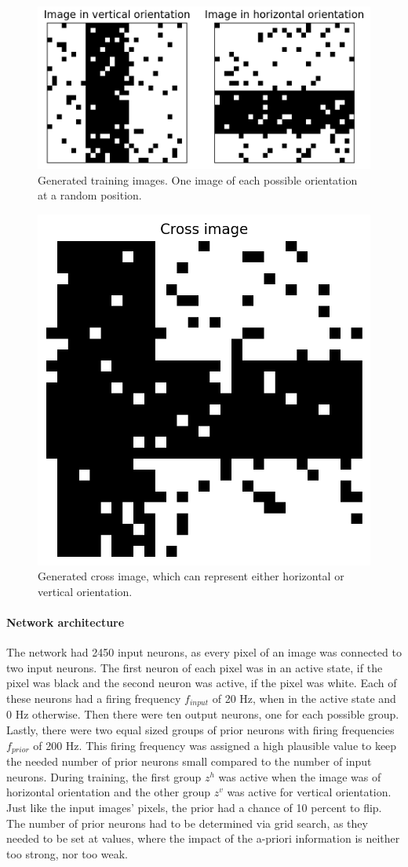 \begin{figure}
  \includegraphics[width=\linewidth]{figures/horvert/horvertTrainingImages.png}
  \caption{Generated training images. One image of each possible orientation at a random position.}
  \label{fig:horvertImages}
\end{figure}

\begin{figure}
\centering
  \includegraphics[width=0.45\linewidth]{figures/horvert/horvertTrainingCrossImage.png}
  \caption{Generated cross image, which can represent either horizontal or vertical orientation.}
  \label{fig:horvertTrainingCrossImage}
\end{figure}

\paragraph{Network architecture}

The network had 2450 input neurons, as every pixel of an image was connected to two input neurons. The first neuron of each pixel was in an active state, if the pixel was black and the second neuron was active, if the pixel was white. Each of these neurons had a firing frequency $f_{input}$ of 20 Hz, when in the active state and 0 Hz otherwise. Then there were ten output neurons, one for each possible group. Lastly, there were two equal sized groups of prior neurons with firing frequencies $f_{prior}$ of 200 Hz. This firing frequency was assigned a high plausible value to keep the needed number of prior neurons small compared to the number of input neurons. During training, the first group $z^h$ was active when the image was of horizontal orientation and the other group $z^v$ was active for vertical orientation. Just like the input images' pixels, the prior had a chance of 10 percent to flip. The number of prior neurons had to be determined via grid search, as they needed to be set at values, where the impact of the a-priori information is neither too strong, nor too weak.

